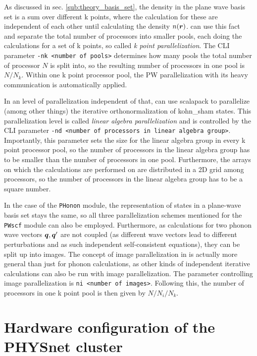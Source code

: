\documentclass[main.tex]{subfiles}
\begin{document}
As discussed in sec. \ref{sub:theory_basis_set}, the density in the plane wave basis set is a sum over different k points, where the calculation for these are independent of each other until calculating the density \(n( \vb*{r})\).
\QE can use this fact and separate the total number of processors into smaller pools, each doing the calculations for a set of k points, so called \emph{k point parallelization}.
The CLI parameter \texttt{-nk <number of pools>} determines how many pools the total number of processor \(N\) is split into, so the resulting number of processors in one pool is \(N / N_k\).
Within one k point processor pool, the PW parallelization with its heavy communication is automatically applied.

In an level of parallelization independent of that, \QE can use \gls{scalapack} to parallelize (among other things) the iterative orthonormalization of \acrshort{kohn_sham} states.
This parallelization level is called \emph{linear algebra parallelization} and is controlled by the CLI parameter \texttt{-nd <number of processors in linear algebra group>}.
Importantly, this parameter sets the size for the linear algebra group in every k point processor pool, so the number of processors in the linear algebra group has to be smaller than the number of processors in one pool.
Furthermore, the arrays on which the calculations are performed on are distributed in a 2D grid among processors, so the number of processors in the linear algebra group has to be a square number.

In the case of the \texttt{PHonon} module, the representation of states in a plane-wave basis set stays the same, so all three parallelization schemes mentioned for the \texttt{PWscf} module can also be employed.
Furthermore, as calculations for two phonon wave vectors \(\vb*{q}, \vb*{q}^{\prime}\) are not coupled (as different wave vectors lead to different perturbations and as such independent self-consistent equations), they can be split up into images.
The concept of image parallelization in \QE is actually more general than just for phonon calculations, as other kinds of independent iterative calculations can also be run with image parallelization.
The parameter controlling image parallelization is \texttt{ni <number of images>}.
Following this, the number of processors in one k point pool is then given by \(N / N_i / N_k\).

\section{Hardware configuration of the PHYSnet cluster}\label{sec:hardware_physnet}
\end{document}
